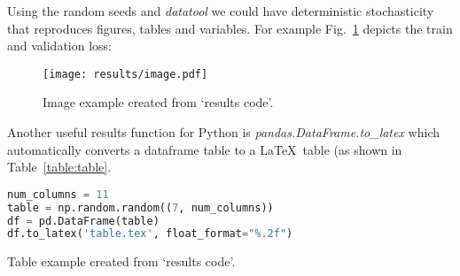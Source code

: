 \documentclass[journal]{IEEEtran}
\begin{document}
Using the random seeds and \textit{datatool} we could have deterministic stochasticity that reproduces figures, tables and variables.
For example Fig.~\ref{fig:image} depicts the train and validation loss:
\begin{figure}[h]
	\texttt{[image: results/image.pdf]}
	\caption{Image example created from `results code'.}
	\label{fig:image}
\end{figure}

Another useful results function for Python is \textit{pandas.DataFrame.to\_latex} which automatically converts a dataframe table to a \LaTeX\ table (as shown in Table~\ref{table:table}.

\begin{lstlisting}[language=python, style=lststyle, caption={Convert Pandas DataFrame to \LaTeX\ table.}, captionpos=b]
num_columns = 11
table = np.random.random((7, num_columns))
df = pd.DataFrame(table)
df.to_latex('table.tex', float_format="%.2f")
\end{lstlisting}

\begin{table}[h]
	\centering
	\caption{Table example created from `results code'.}
	\label{table:table}
	\setlength\tabcolsep{4.2pt}
	
\end{table}



\end{document}
